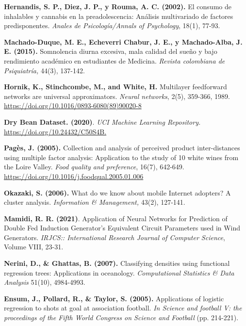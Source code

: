 \begin{thebibliography}{99}
\textbf{Hernandis, S. P., Diez, J. P., y Rouma, A. C. (2002).} El consumo de inhalables y cannabis en la preadolescencia: Análisis multivariado de factores predisponentes. \emph{Anales de Psicología/Annals of Psychology}, 18(1), 77-93.

 \textbf{Machado-Duque, M. E., Echeverri Chabur, J. E., y Machado-Alba, J. E. (2015).} Somnolencia diurna excesiva, mala calidad del sueño y bajo rendimiento académico en estudiantes de Medicina. \emph{Revista colombiana de Psiquiatría,} 44(3), 137-142.



 \textbf{Hornik, K., Stinchcombe, M., and White, H. } Multilayer feedforward networks are universal approximators. \emph{Neural networks}, 2(5), 359-366, 1989.
\url{https://doi.org/10.1016/0893-6080(89)90020-8}

 \textbf{Dry Bean Dataset. (2020)}.\emph{ UCI Machine Learning Repository. } \url{https://doi.org/10.24432/C50S4B.}

\textbf{Pagès, J. (2005).} Collection and analysis of perceived product inter-distances using multiple factor analysis: Application to the study of 10 white wines from the Loire Valley. \emph{Food quality and preference}, 16(7), 642-649.  \url{https://doi.org/10.1016/j.foodqual.2005.01.006
}

\textbf{Okazaki, S. (2006).} What do we know about mobile Internet adopters? A cluster analysis. \emph{Information \& Management,} 43(2), 127-141. 

\textbf{Mamidi, R. R. (2021)}. Application of Neural Networks for Prediction of Double Fed Induction Generator’s Equivalent Circuit Parameters used in Wind Generators. \emph{IRJCS:: International Research Journal of Computer Science}, Volume VIII, 23-31.

\textbf{Nerini, D., \& Ghattas, B. (2007).} Classifying densities using functional regression trees: Applications in oceanology. \emph{Computational Statistics \& Data Analysis} 51(10), 4984-4993.

\textbf{Ensum, J., Pollard, R., \& Taylor, S. (2005).} Applications of logistic regression to shots at goal at association football. \emph{In Science and football V: the proceedings of the Fifth World Congress on Science and Football} (pp. 214-221).


\end{thebibliography}
